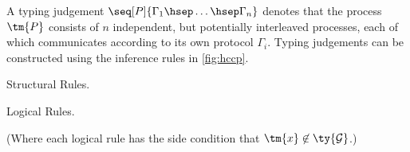\begin{definition}\label{def:hccp-typing}
  A typing judgement $\seq[P]{\Gamma_1 \hsep \dots \hsep \Gamma_n}$ denotes
  that the process $\tm{P}$ consists of $n$ independent, but potentially
  interleaved processes, each of which communicates according to its own
  protocol $\Gamma_i$. 
  Typing judgements can be constructed using the inference rules in
  \cref{fig:hccp}.
\end{definition}
\begin{figure*}[!htb]
  Structural Rules.
  \begin{center} \hccpInfAx        \hccpInfCycle \end{center}\vspace*{1\baselineskip}
  \begin{center} \hccpInfMix       \hccpInfHalt  \end{center}\vspace*{1\baselineskip}

  Logical Rules.
  \begin{center} \hccpInfBoundTens \hccpInfParr  \end{center}\vspace*{1\baselineskip}
  \begin{center} \hccpInfOne       \hccpInfBot   \end{center}\vspace*{1\baselineskip}
  \begin{center}       \end{center}\vspace*{1\baselineskip}
  \begin{center} \hccpInfWith                    \end{center}\vspace*{1\baselineskip}
  \begin{center} \hccpInfNil       \hccpInfTop   \end{center}\vspace*{1\baselineskip}

  \centering
  (Where each logical rule has the side condition that $\tm{x} \not\in \ty{\mathcal{G}}$.)

  \caption{Hypersequent Cyclic Classical Processes with \textsc{H-Mix}}
  \label{fig:hccp}
\end{figure*}
